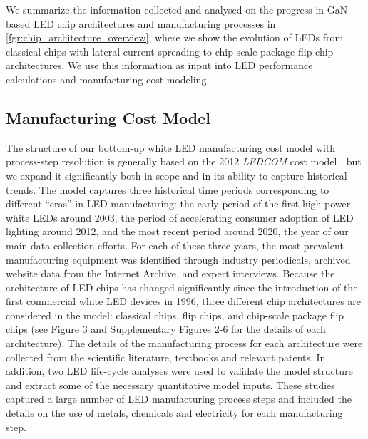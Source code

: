 \documentclass[parskip=full]{article}
\begin{document}
We summarize the information collected and analysed on the progress in GaN-based LED chip architectures and manufacturing processes in \cref{fgr:chip_architecture_overview}, where we show the evolution of LEDs from classical chips with lateral current spreading to chip-scale package flip-chip architectures. We use this information as input into LED performance calculations and manufacturing cost modeling. 

\subsection{Manufacturing Cost Model}

The structure of our bottom-up white LED manufacturing cost model with process-step resolution is generally based on the 2012 \textit{LEDCOM} cost model \cite{ledcomv2}, but we expand it significantly both in scope and in its ability to capture historical trends. The model captures three historical time periods corresponding to different “eras” in LED manufacturing: the early period of the first high-power white LEDs around 2003, the period of accelerating consumer adoption of LED lighting around 2012, and the most recent period around 2020, the year of our main data collection efforts. For each of these three years, the most prevalent manufacturing equipment was identified through industry periodicals, archived website data from the Internet Archive, and expert interviews. Because the architecture of LED chips has changed significantly since the introduction of the first commercial white LED devices in 1996, three different chip architectures are considered in the model: classical chips, flip chips, and chip-scale package flip chips (see Figure 3 and Supplementary Figures 2-6 for the details of each architecture). The details of the manufacturing process for each architecture were collected from the scientific literature, textbooks and relevant patents. In addition, two LED life-cycle analyses were used to validate the model structure and extract some of the necessary quantitative model inputs. These studies captured a large number of LED manufacturing process steps and included the details on the use of metals, chemicals and electricity for each manufacturing step.
\end{document}
